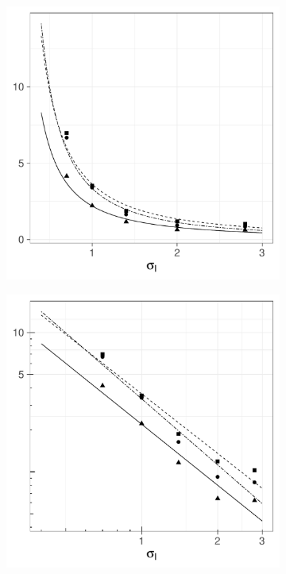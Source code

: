 \begin{figure}[htbp]
    \begin{subfigure}[t]{0.49\textwidth}
        \includegraphics[width=\textwidth]{results/by_cases_spread/NMISE-vs-risk-spread}
        \caption{}
        \label{fig:ise:unif_Spreads_1h:nmise}
    \end{subfigure}
    \begin{subfigure}[t]{0.49\textwidth}
        \includegraphics[width=\textwidth]{results/by_cases_spread/NMISE-vs-risk-spread-log-log}

\end{subfigure}
\end{figure}
